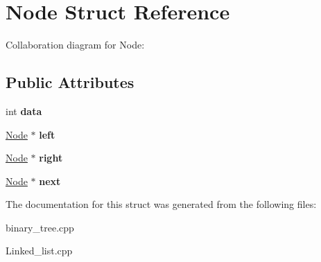 \hypertarget{structNode}{}\section{Node Struct Reference}
\label{structNode}


Collaboration diagram for Node\+:
\subsection*{Public Attributes}
\begin{DoxyCompactItemize}
\item 
int {\bfseries data}\hypertarget{structNode_a87c003c9f600e3fc58e6e90835f0b605}{}\label{structNode_a87c003c9f600e3fc58e6e90835f0b605}

\item 
\hyperlink{structNode}{Node} $\ast$ {\bfseries left}\hypertarget{structNode_ab8c667ac8fdb120ed4c031682a9cdaee}{}\label{structNode_ab8c667ac8fdb120ed4c031682a9cdaee}

\item 
\hyperlink{structNode}{Node} $\ast$ {\bfseries right}\hypertarget{structNode_afe5916d969cd32f7de1e4ba15580c989}{}\label{structNode_afe5916d969cd32f7de1e4ba15580c989}

\item 
\hyperlink{structNode}{Node} $\ast$ {\bfseries next}\hypertarget{structNode_a2559a716f69ccaa76d648d9f1b83065e}{}\label{structNode_a2559a716f69ccaa76d648d9f1b83065e}

\end{DoxyCompactItemize}


The documentation for this struct was generated from the following files\+:\begin{DoxyCompactItemize}
\item 
binary\+\_\+tree.\+cpp\item 
Linked\+\_\+list.\+cpp\end{DoxyCompactItemize}
